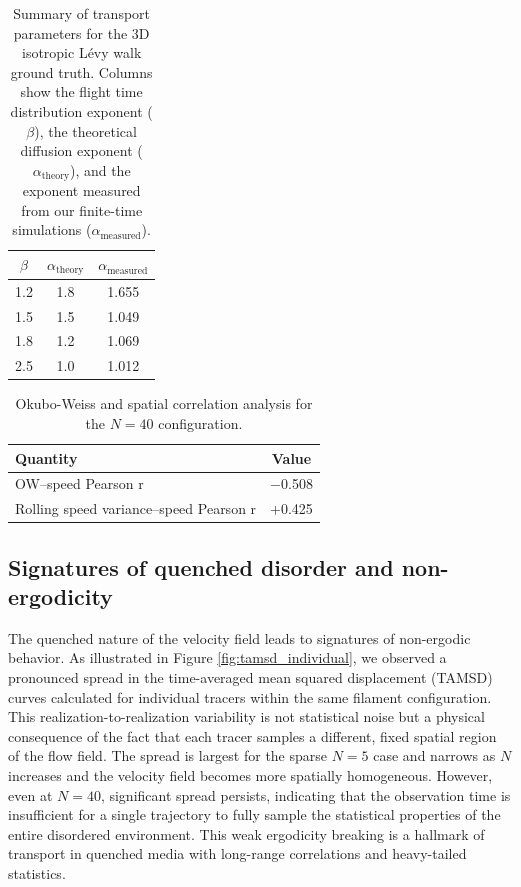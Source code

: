 \documentclass[]{article}
\begin{document}
\begin{table}[h!]
\centering
\caption{Summary of transport parameters for the 3D isotropic L\'evy walk ground truth. Columns show the flight time distribution exponent ($\beta$), the theoretical diffusion exponent ($\alpha_{\text{theory}}$), and the exponent measured from our finite-time simulations ($\alpha_{\text{measured}}$).}
\label{tab:params_levy}
\begin{tabular}{ccc}
\hline
$\beta$ & $\alpha_{\text{theory}}$ & $\alpha_{\text{measured}}$ \\
\hline
1.2 & 1.8 & 1.655 \\
1.5 & 1.5 & 1.049 \\
1.8 & 1.2 & 1.069 \\
2.5 & 1.0 & 1.012 \\
\hline
\end{tabular}
\end{table}

\begin{table}[h!]
\centering
\caption{Okubo-Weiss and spatial correlation analysis for the $N=40$ configuration.}
\label{tab:params_ow}
\begin{tabular}{lc}
\hline
Quantity & Value \\
\hline
OW--speed Pearson r & $-$0.508 \\
Rolling speed variance--speed Pearson r & +0.425 \\
\hline
\end{tabular}
\end{table}

\subsection{Signatures of quenched disorder and non-ergodicity}

The quenched nature of the velocity field leads to signatures of non-ergodic behavior. As illustrated in Figure \ref{fig:tamsd_individual}, we observed a pronounced spread in the time-averaged mean squared displacement (TAMSD) curves calculated for individual tracers within the same filament configuration. This realization-to-realization variability is not statistical noise but a physical consequence of the fact that each tracer samples a different, fixed spatial region of the flow field. The spread is largest for the sparse $N=5$ case and narrows as $N$ increases and the velocity field becomes more spatially homogeneous. However, even at $N=40$, significant spread persists, indicating that the observation time is insufficient for a single trajectory to fully sample the statistical properties of the entire disordered environment. This weak ergodicity breaking is a hallmark of transport in quenched media with long-range correlations and heavy-tailed statistics.
\end{document}
